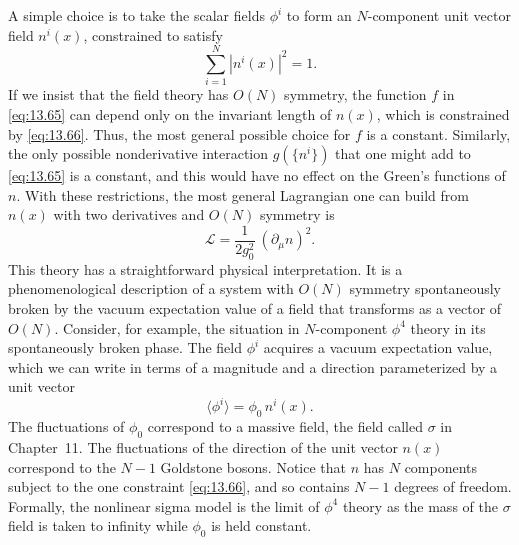 A simple choice is to take the scalar fields $\phi^i$ to form an
$N$-component unit vector field $n^i(x)$, constrained to satisfy
\begin{equation}
  \sum_{i=1}^{N} |n^i(x)|^2 = 1 .
  \label{eq:13.66}
\end{equation}
If we insist that the field theory has $O(N)$ symmetry, the function $f$ in
\eqref{eq:13.65} can depend only on the invariant length of $n(x)$, which is
constrained by \eqref{eq:13.66}.  Thus, the most general possible choice for
$f$ is a constant.  Similarly, the only possible nonderivative interaction
$g(\{n^i\})$ that one might add to \eqref{eq:13.65} is a constant, and this
would have no effect on the Green's functions of $n$.  With these
restrictions, the most general Lagrangian one can build from $n(x)$ with two
derivatives and $O(N)$ symmetry is
\begin{equation}
  \mathcal{L} = \frac{1}{2g_0^2}\ (\partial_\mu n)^2 .
  \label{eq:13.67}
\end{equation}
This theory has a straightforward physical interpretation.  It is a
phenomenological description of a system with $O(N)$ symmetry spontaneously
broken by the vacuum expectation value of a field that transforms as a vector
of $O(N)$.  Consider, for example, the situation in $N$-component $\phi^4$
theory in its spontaneously broken phase.  The field $\phi^i$ acquires a
vacuum expectation value, which we can write in terms of a magnitude and a
direction parameterized by a unit vector
\begin{equation}
  \langle\phi^i\rangle = \phi_0\,n^i(x) .
  \label{eq:13.68}
\end{equation}
The fluctuations of $\phi_0$ correspond to a massive field, the field called
$\sigma$ in Chapter~11.  The fluctuations of the direction of the unit vector
$n(x)$ correspond to the $N-1$ Goldstone bosons.  Notice that $n$ has $N$
components subject to the one constraint \eqref{eq:13.66}, and so contains
$N-1$ degrees of freedom.  Formally, the nonlinear sigma model is the limit
of $\phi^4$ theory as the mass of the $\sigma$ field is taken to infinity
while $\phi_0$ is held constant.

